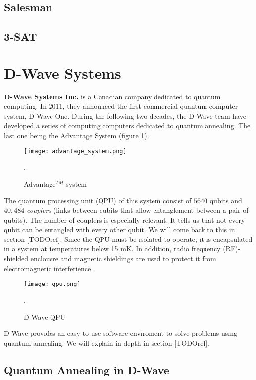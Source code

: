 \subsection{Salesman}

\subsection{3-SAT}




\section{D-Wave Systems}


\textbf{D-Wave Systems Inc.} is a Canadian company dedicated to quantum computing. In 2011, they announced the first commercial quantum computer system, D-Wave One. During the following two decades, the D-Wave team have developed a series of computing computers dedicated to quantum annealing. The last one being the Advantage System (figure \ref{fig 2.2}).

\begin{figure}[h]
	\texttt{[image: advantage\_system.png]}
	\centering
	\caption{Advantage$^{TM}$ system}.
	\label{fig 2.2}
\end{figure}

The quantum processing unit (QPU) of this system consist of $5640$ qubits and $40,484$ \emph{couplers} (links between qubits that allow entanglement between a pair of qubits). The number of couplers is especially relevant. It tells us that not every qubit can be entangled with every other qubit. We will come back to this in section [TODOref]. Since the QPU must be isolated to operate, it is encapsulated in a system at temperatures below 15 mK. In addition, radio frequency (RF)-shielded enclousre and magnetic shieldings are used to protect it from electromagnetic interferience \cite{DWaveDoc}.

\begin{figure}[h]
	\texttt{[image: qpu.png]}
	\centering
	\caption{D-Wave QPU}.
	\label{fig 2.3}
\end{figure}

D-Wave provides an easy-to-use software enviroment to solve problems using quantum annealing. We will explain in depth in section [TODOref].


\subsection{Quantum Annealing in D-Wave}
\label{quantum-annealing-dwave}


